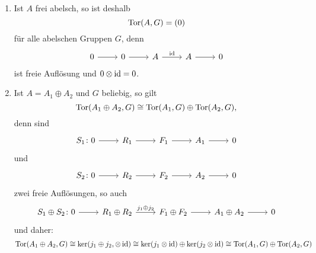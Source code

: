 \begin{beispiel}
  \begin{enumerate}
    \item
      Ist $A$ frei abelsch, so ist deshalb
      \begin{equation*}
        \mathrm{Tor}(A,G) = (0)
      \end{equation*}
      für alle abelschen Gruppen $G$, denn
      \begin{equation*}
        \begin{tikzcd}
          0 \arrow{r}{}
          & 0 \arrow{r}{}
          & A \arrow{r}{\id}
          & A \arrow{r}{}
          & 0
        \end{tikzcd}
      \end{equation*}
      ist freie Auflösung und $0 \otimes \operatorname{id} = 0$.
    \item
      Ist $A = A_1 \oplus A_2$ und $G$ beliebig, so gilt
      \begin{equation*}
        \mathrm{Tor}(A_1 \oplus A_2,G) \cong \mathrm{Tor}(A_1, G) \oplus \mathrm{Tor}(A_2, G),
      \end{equation*}
      denn sind
      \begin{equation*}
        \begin{tikzcd}
          S_1\colon 0 \arrow{r}{}
          & R_1 \arrow{r}{}
          & F_1 \arrow{r}{}
          & A_1 \arrow{r}{}
          & 0
        \end{tikzcd}
      \end{equation*}
      und
      \begin{equation*}
        \begin{tikzcd}
          S_2\colon 0 \arrow{r}{}
          & R_2 \arrow{r}{}
          & F_2 \arrow{r}{}
          & A_2 \arrow{r}{}
          & 0
        \end{tikzcd}
      \end{equation*}
      zwei freie Auflösungen, so auch
      \begin{equation*}
        \begin{tikzcd}
          S_1 \oplus S_2 \colon 0 \arrow{r}{}
          & R_1 \oplus R_2 \arrow{r}{j_1 \oplus j_2}
          & F_1 \oplus F_2 \arrow{r}{}
          & A_1 \oplus A_2 \arrow{r}{}
          & 0
        \end{tikzcd}
      \end{equation*}
      und daher:
      \begin{equation*}
        \Tor(A_1 \oplus A_2, G) \cong \ker(j_1 \oplus j_2,\tensor \id) \cong \ker(j_1 \tensor \id) \oplus \ker(j_2 \tensor \id) \cong \Tor(A_1, G) \oplus \Tor(A_2, G)

\end{equation*}
\end{enumerate}
\end{beispiel}
